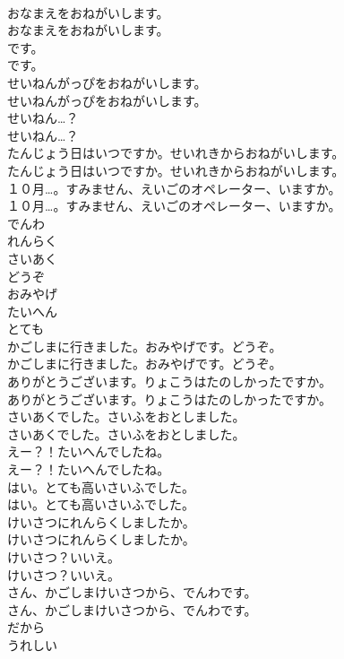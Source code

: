 \documentclass[8pt]{extreport}
\begin{document}
\begin{CJK}{UTF8}{min}
\\	おなまえをおねがいします。	
\\	おなまえをおねがいします。 
\\	です。	
\\	です。 
\\	せいねんがっぴをおねがいします。	
\\	せいねんがっぴをおねがいします。 
\\	せいねん…？	
\\	せいねん…？ 
\\	たんじょう日はいつですか。せいれきからおねがいします。	
\\	たんじょう日はいつですか。せいれきからおねがいします。 
\\	１０月…。すみません、えいごのオペレーター、いますか。	
\\	１０月…。すみません、えいごのオペレーター、いますか。 
\\	でんわ
\\	れんらく
\\	さいあく
\\	どうぞ
\\	おみやげ
\\	たいへん
\\	とても
\\	かごしまに行きました。おみやげです。どうぞ。
\\	かごしまに行きました。おみやげです。どうぞ。
\\	ありがとうございます。りょこうはたのしかったですか。	
\\	ありがとうございます。りょこうはたのしかったですか。 
\\	さいあくでした。さいふをおとしました。	
\\	さいあくでした。さいふをおとしました。 
\\	えー？！たいへんでしたね。	
\\	えー？！たいへんでしたね。 
\\	はい。とても高いさいふでした。
\\	はい。とても高いさいふでした。
\\	けいさつにれんらくしましたか。	
\\	けいさつにれんらくしましたか。 
\\	けいさつ？いいえ。	
\\	けいさつ？いいえ。 
\\	さん、かごしまけいさつから、でんわです。	
\\	さん、かごしまけいさつから、でんわです。 
\\	だから
\\	うれしい

\end{CJK}
\end{document}
